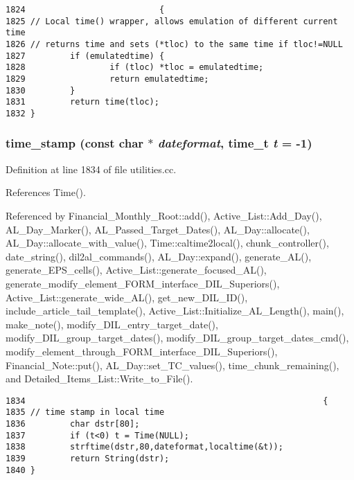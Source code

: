 \footnotesize\begin{verbatim}1824                           {
1825 // Local time() wrapper, allows emulation of different current time
1826 // returns time and sets (*tloc) to the same time if tloc!=NULL
1827         if (emulatedtime) {
1828                 if (tloc) *tloc = emulatedtime;
1829                 return emulatedtime;
1830         }
1831         return time(tloc);
1832 }
\end{verbatim}\normalsize 
{}
\subsubsection{ time\_\-stamp (const char $\ast$ {\em dateformat}, time\_\-t {\em t} = -1)}\label{utilities_8cc_a20}




Definition at line 1834 of file utilities.cc.

References Time().

Referenced by Financial\_\-Monthly\_\-Root::add(), Active\_\-List::Add\_\-Day(), AL\_\-Day\_\-Marker(), AL\_\-Passed\_\-Target\_\-Dates(), AL\_\-Day::allocate(), AL\_\-Day::allocate\_\-with\_\-value(), Time::caltime2local(), chunk\_\-controller(), date\_\-string(), dil2al\_\-commands(), AL\_\-Day::expand(), generate\_\-AL(), generate\_\-EPS\_\-cells(), Active\_\-List::generate\_\-focused\_\-AL(), generate\_\-modify\_\-element\_\-FORM\_\-interface\_\-DIL\_\-Superiors(), Active\_\-List::generate\_\-wide\_\-AL(), get\_\-new\_\-DIL\_\-ID(), include\_\-article\_\-tail\_\-template(), Active\_\-List::Initialize\_\-AL\_\-Length(), main(), make\_\-note(), modify\_\-DIL\_\-entry\_\-target\_\-date(), modify\_\-DIL\_\-group\_\-target\_\-dates(), modify\_\-DIL\_\-group\_\-target\_\-dates\_\-cmd(), modify\_\-element\_\-through\_\-FORM\_\-interface\_\-DIL\_\-Superiors(), Financial\_\-Note::put(), AL\_\-Day::set\_\-TC\_\-values(), time\_\-chunk\_\-remaining(), and Detailed\_\-Items\_\-List::Write\_\-to\_\-File().



\footnotesize\begin{verbatim}1834                                                            {
1835 // time stamp in local time
1836         char dstr[80];
1837         if (t<0) t = Time(NULL);
1838         strftime(dstr,80,dateformat,localtime(&t));
1839         return String(dstr);
1840 }
\end{verbatim}\normalsize 
{}
